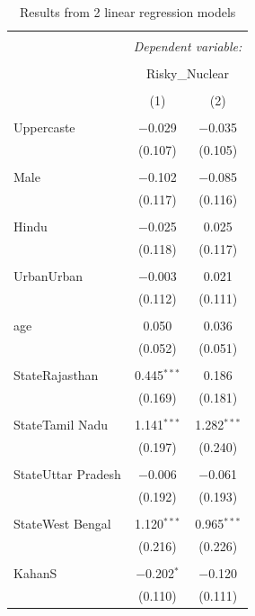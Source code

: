 \documentclass[
]{article}
\begin{document}
\begin{table}[!htbp] \centering 
  \caption{Results from 2 linear regression models} 
  \label{} 
\begin{tabular}{@{\extracolsep{5pt}}lcc} 
\\[-1.8ex]\hline 
\hline \\[-1.8ex] 
 & \multicolumn{2}{c}{\textit{Dependent variable:}} \\ 
\cline{2-3} 
\\[-1.8ex] & \multicolumn{2}{c}{Risky\_Nuclear} \\ 
\\[-1.8ex] & (1) & (2)\\ 
\hline \\[-1.8ex] 
 Uppercaste & $-$0.029 & $-$0.035 \\ 
  & (0.107) & (0.105) \\ 
  & & \\ 
 Male & $-$0.102 & $-$0.085 \\ 
  & (0.117) & (0.116) \\ 
  & & \\ 
 Hindu & $-$0.025 & 0.025 \\ 
  & (0.118) & (0.117) \\ 
  & & \\ 
 UrbanUrban & $-$0.003 & 0.021 \\ 
  & (0.112) & (0.111) \\ 
  & & \\ 
 age & 0.050 & 0.036 \\ 
  & (0.052) & (0.051) \\ 
  & & \\ 
 StateRajasthan & 0.445$^{***}$ & 0.186 \\ 
  & (0.169) & (0.181) \\ 
  & & \\ 
 StateTamil Nadu & 1.141$^{***}$ & 1.282$^{***}$ \\ 
  & (0.197) & (0.240) \\ 
  & & \\ 
 StateUttar Pradesh & $-$0.006 & $-$0.061 \\ 
  & (0.192) & (0.193) \\ 
  & & \\ 
 StateWest Bengal & 1.120$^{***}$ & 0.965$^{***}$ \\ 
  & (0.216) & (0.226) \\ 
  & & \\ 
 KahanS & $-$0.202$^{*}$ & $-$0.120 \\ 
  & (0.110) & (0.111) \\ 

\end{tabular}
\end{table}
\end{document}

